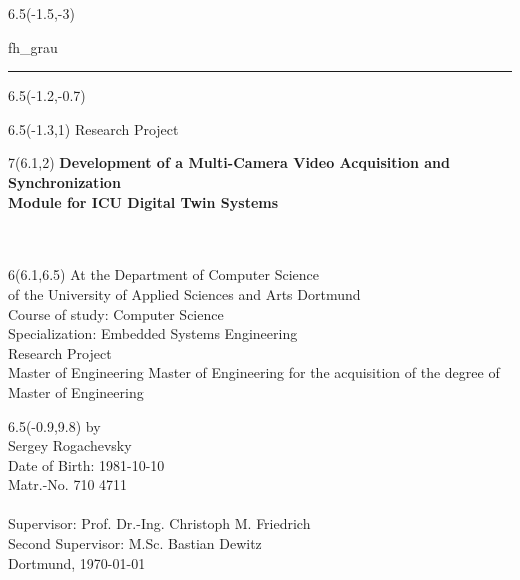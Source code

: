 \documentclass[12pt]{report}           %
\renewcommand{\author}{Sergey Rogachevsky}           %
\newcommand{\dateOfBirth}{1981-10-10}           %
\newcommand{\matrNumber}{710 4711}              %
\newcommand{\studycourse}{Computer Science}           %
\newcommand{\specialization}{Embedded Systems Engineering}           %
\newcommand{\supervisor}{Prof. Dr.-Ing. Christoph M. Friedrich} %
\newcommand{\secondsupervisor}{M.Sc. Bastian Dewitz} %
\newcommand{\institution}{University of Applied Sciences and Arts Dortmund} %
\newcommand{\faculty}{Computer Science}               %
\newcommand{\toponym}{Dortmund}                 %
\newcommand{\subject}{Research Project}  %
\newcommand{\titel}{Development of a Multi-Camera Video Acquisition and Synchronization \\ Module for ICU Digital Twin Systems \\ } %
\newcommand{\subtitel}{} %
\newcommand{\degree}{Master of Engineering} %
\theoremstyle{thesis}        %
\begin{document}
	\sloppy
	
	\begin{titlepage}
		
		\begin{textblock}{6.5}(-1.5,-3)
			\begin{color}{fh_grau}
				\rule{9cm}{33cm}    
			\end{color}
		\end{textblock}
		\begin{textblock}{6.5}(-1.2,-0.7)
		\end{textblock}
		\begin{textblock}{6.5}(-1.3,1)
			{\large \textsf{\subject}}            
		\end{textblock}
		
		\begin{textblock}{7}(6.1,2)
			{\noindent \large
				\textsf{\textbf{\titel} \\ 
					\large \subtitel \\} }
		\end{textblock}
		
		
		\begin{textblock}{6}(6.1,6.5)\noindent
			\textsf{At the Department of \faculty\\
				of the \institution \\
				Course of study: \studycourse \\
				Specialization: \specialization \\
				\subject \\
				\ifdefined\degree%
				\if\degree\empty%
				\else%
				for the acquisition of the degree of \\
				\degree
				\fi
				\else%
				\fi}
		\end{textblock}
		
		\begin{textblock}{6.5}(-0.9,9.8)
			\noindent
			\textsf{by \\
				\author \\
				Date of Birth: \dateOfBirth  \\
				Matr.-No. \matrNumber \\\\
				Supervisor: \supervisor \\
				Second Supervisor: \secondsupervisor \\      \toponym, \today}    
		\end{textblock}
		
	\end{titlepage}
	
\end{document}
